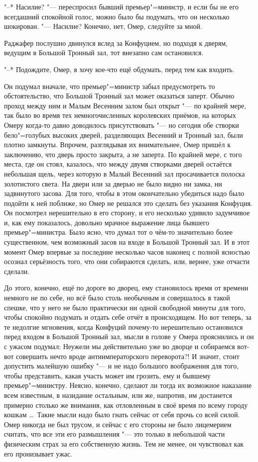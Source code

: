 "--* Насилие? "--- переспросил бывший премьер"=министр, и если бы не его
всегдашний спокойной голос, можно было бы подумать, что он несколько шокирован.
"--- Насилие?
Конечно, нет, Омер, следуйте за мной.

Раджафер послушно двинулся вслед за Конфуцием, но подходя к дверям, ведущим в
Большой Тронный зал, тот внезапно сам остановился.

"--* Подождите, Омер, я хочу кое-что ещё обдумать, перед тем как входить.

Он подумал вначале, что премьер"=министр забыл предусмотреть то обстоятельство,
что Большой Тронный зал может оказаться заперт.
Обычно проход между ним и Малым Весенним залом был открыт "--- по крайней
мере, так было во время тех немногочисленных королевских приёмов, на которых
Омеру когда-то давно доводилось присутствовать "--- но сегодня обе створки
бело"=голубых высоких дверей, разделяющих Весенний и Тронный зал, были плотно
замкнуты.
Впрочем, разглядывая их внимательнее, Омер пришёл к заключению, что дверь просто
закрыта, а не заперта.
По крайней мере, с того места, где он стоял, казалось, что между двумя створками
дверей остаётся небольшая щель, через которую в Малый Весенний зал просачивается
полоска золотистого света.
На двери или за дверью не было видно ни замка, ни задвинутого засова.
Для того, чтобы в этом окончательно убедиться надо было подойти к ней поближе,
но Омер не решался это сделать без указания Конфуция.
Он посмотрел нерешительно в его сторону, и его несколько удивило задумчивое и,
как ему показалось, довольно мрачное выражение лица бывшего премьер"=министра.
Было ясно, что думал тот о чём-то значительно более существенном, чем возможный
засов на входе в Большой Тронный зал.
И в этот момент Омер впервые за последние несколько часов наконец с полной
ясностью осознал серьёзность того, что они собираются сделать, или, вернее, уже
отчасти сделали.

До этого, конечно, ещё по дороге во дворец, ему становилось время от времени
немного не по себе, но всё было столь необычным и совершалось в такой спешке,
что у него не было практически ни одной свободной минуты для того, чтобы
спокойно подумать и отдать себе отчёт в происходящем.
Но вот теперь, за те недолгие мгновения, когда Конфуций почему-то нерешительно
остановился перед входом в Большой Тронный зал, мысли в голове у Омера
прояснились и он с ужасом подумал:
Неужели мы действительно уже во дворце и собираемся вот-вот совершить нечто
вроде антиимператорского переворота?!
И значит, стоит допустить малейшую ошибку "--- и не надо большого воображения
для того, чтобы представить, какая участь может им грозить, ему и бывшему
премьер"=министру.
Неясно, конечно, сделают ли тогда их возможное наказание всем известным, в
назидание остальным, или же, напротив, им достанется примерно столько же
внимания, как отловленным в своё время по всему городу кошкам \ldots\
Такие мысли надо было гнать сейчас от себя прочь со всей силой.
Омер никогда не был трусом, и сейчас с его стороны не было лицемерием считать,
что все эти его размышления "--- это только в небольшой части физическим страх
за его собственную жизнь.
Тем не менее, он чувствовал как его пронизывает ужас.

